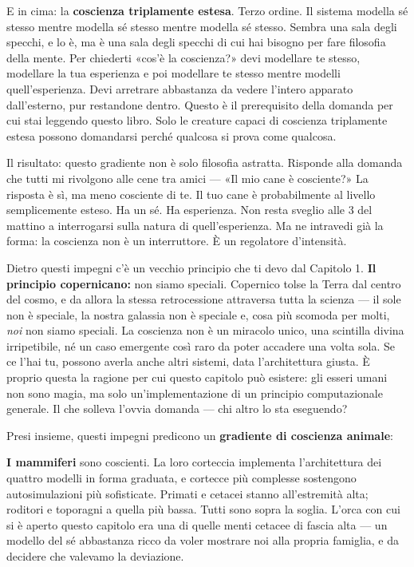 \documentclass[11pt, twoside, openright]{book}
\begin{document}
E in cima: la \textbf{coscienza triplamente estesa}. Terzo ordine. Il sistema modella sé stesso mentre modella sé stesso mentre modella sé stesso. Sembra una sala degli specchi, e lo è, ma è una sala degli specchi di cui hai bisogno per fare filosofia della mente. Per chiederti «cos'è la coscienza?» devi modellare te stesso, modellare la tua esperienza e poi modellare te stesso mentre modelli quell'esperienza. Devi arretrare abbastanza da vedere l'intero apparato dall'esterno, pur restandone dentro. Questo è il prerequisito della domanda per cui stai leggendo questo libro. Solo le creature capaci di coscienza triplamente estesa possono domandarsi perché qualcosa si prova come qualcosa.

Il risultato: questo gradiente non è solo filosofia astratta. Risponde alla domanda che tutti mi rivolgono alle cene tra amici --- «Il mio cane è cosciente?» La risposta è sì, ma meno cosciente di te. Il tuo cane è probabilmente al livello semplicemente esteso. Ha un sé. Ha esperienza. Non resta sveglio alle 3 del mattino a interrogarsi sulla natura di quell'esperienza. Ma ne intravedi già la forma: la coscienza non è un interruttore. È un regolatore d'intensità.

Dietro questi impegni c'è un vecchio principio che ti devo dal Capitolo 1. \textbf{Il principio copernicano:} non siamo speciali. Copernico tolse la Terra dal centro del cosmo, e da allora la stessa retrocessione attraversa tutta la scienza --- il sole non è speciale, la nostra galassia non è speciale e, cosa più scomoda per molti, \textit{noi} non siamo speciali. La coscienza non è un miracolo unico, una scintilla divina irripetibile, né un caso emergente così raro da poter accadere una volta sola. Se ce l'hai tu, possono averla anche altri sistemi, data l'architettura giusta. È proprio questa la ragione per cui questo capitolo può esistere: gli esseri umani non sono magia, ma solo un'implementazione di un principio computazionale generale. Il che solleva l'ovvia domanda --- chi altro lo sta eseguendo?

Presi insieme, questi impegni predicono un \textbf{gradiente di coscienza animale}:

\textbf{I mammiferi} sono coscienti. La loro corteccia implementa l'architettura dei quattro modelli in forma graduata, e cortecce più complesse sostengono autosimulazioni più sofisticate. Primati e cetacei stanno all'estremità alta; roditori e toporagni a quella più bassa. Tutti sono sopra la soglia. L'orca con cui si è aperto questo capitolo era una di quelle menti cetacee di fascia alta --- un modello del sé abbastanza ricco da voler mostrare noi alla propria famiglia, e da decidere che valevamo la deviazione.
\end{document}
